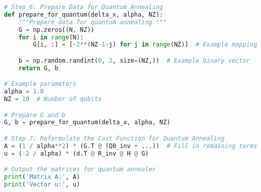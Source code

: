 \documentclass{article}
\begin{document}
\begin{lstlisting}[language=Python]
# Step 6: Prepare Data for Quantum Annealing
def prepare_for_quantum(delta_x, alpha, NZ):
    """Prepare data for quantum annealing."""
    G = np.zeros((N, NZ))
    for i in range(N):
        G[i, :] = [-2**(NZ-1-j) for j in range(NZ)]  # Example mapping logic

    b = np.random.randint(0, 2, size=(NZ,))  # Example binary vector
    return G, b

# Example parameters
alpha = 1.0
NZ = 10  # Number of qubits

# Prepare G and b
G, b = prepare_for_quantum(delta_x, alpha, NZ)

# Step 7: Reformulate the Cost Function for Quantum Annealing
A = (1 / alpha**2) * (G.T @ (Q0_inv + ...))  # Fill in remaining terms
u = (-2 / alpha) * (d.T @ R_inv @ H @ G)

# Output the matrices for quantum annealer
print('Matrix A:', A)
print('Vector u:', u)

\end{lstlisting}
\end{document}
